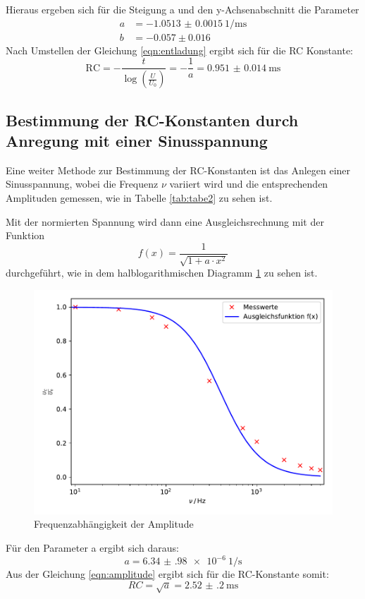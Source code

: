 Hieraus ergeben sich für die Steigung a und den y-Achsenabschnitt die Parameter
\begin{align*}
  a&= \SI{-1.0513(15)}{1\per\milli\second} \\
  b&= -0.057 \pm 0.016
\end{align*}
Nach Umstellen der Gleichung \ref{eqn:entladung} ergibt sich für die RC Konstante:
\begin{equation}
  \text{RC} = -\frac{t}{\log\left({\frac{U}{U_0}}\right)} = -\frac{1}{a} =
  \SI{0.951(14)}{\milli\second}
\end{equation}
\subsection{Bestimmung der RC-Konstanten durch Anregung mit einer Sinusspannung}
Eine weiter Methode zur Bestimmung der RC-Konstanten ist das Anlegen einer
Sinusspannung, wobei die Frequenz $ \nu $ variiert wird und die entsprechenden
Amplituden gemessen, wie in Tabelle \ref{tab:tabe2} zu sehen ist.

Mit der normierten Spannung wird dann eine Ausgleichsrechnung mit der Funktion
\begin{equation}
  f(x)= \frac{1}{\sqrt{1+a\cdot x^2}}
\end{equation}
durchgeführt, wie in dem halblogarithmischen Diagramm \ref{fig:Ampl} zu sehen ist.
\begin{figure}[H]
  \centering
  \includegraphics{plot2.pdf}
  \caption{Frequenzabhängigkeit der Amplitude}
  \label{fig:Ampl}
\end{figure}
Für den Parameter a ergibt sich daraus:
\begin{equation*}
  a= \SI{6.34(98)e-6}{1\per\second}
\end{equation*}
Aus der Gleichung \ref{eqn:amplitude} ergibt sich für die RC-Konstante
somit:
\begin{equation}
  RC = \sqrt{a} =\SI{2.52(20)}{\milli\second}
\end{equation}
